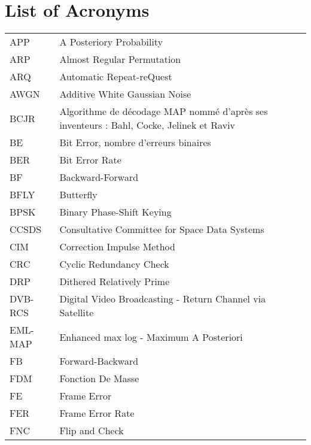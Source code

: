 \chapter*{List of Acronyms}
\begin{center}

\begin{longtable}{ p{}  p{} }

APP 		& 	A Posteriory Probability																			\\
ARP 		& 	Almost Regular Permutation 																			\\
ARQ 		& 	Automatic Repeat-reQuest	 																		\\
AWGN 		&   Additive White Gaussian Noise	 																	\\
BCJR 		&	Algorithme de décodage MAP nommé d'après ses inventeurs : Bahl, Cocke, Jelinek et Raviv				\\
BE 			& 	Bit Error, nombre d'erreurs binaires	 															\\
BER 		&   Bit Error Rate																						\\
BF 			&	Backward-Forward																					\\
BFLY 		&	Butterfly																							\\
BPSK 		&	Binary Phase-Shift Keying																			\\
CCSDS 		&   Consultative Committee for Space Data Systems														\\
CIM 		&  	Correction Impulse Method																			\\
CRC 		& 	Cyclic Redundancy Check 																			\\
DRP 		&   Dithered Relatively Prime																			\\
DVB-RCS 	&   Digital Video Broadcasting - Return Channel via Satellite	 										\\
EML-MAP 	&   Enhanced max log - Maximum A Posteriori																\\
FB 			&	Forward-Backward																					\\
FDM			&   Fonction De Masse																					\\
FE 			& 	Frame Error	 																						\\
FER 		&   Frame Error Rate																					\\
FNC 		&   Flip and Check																						\\

\end{longtable}
\end{center}
